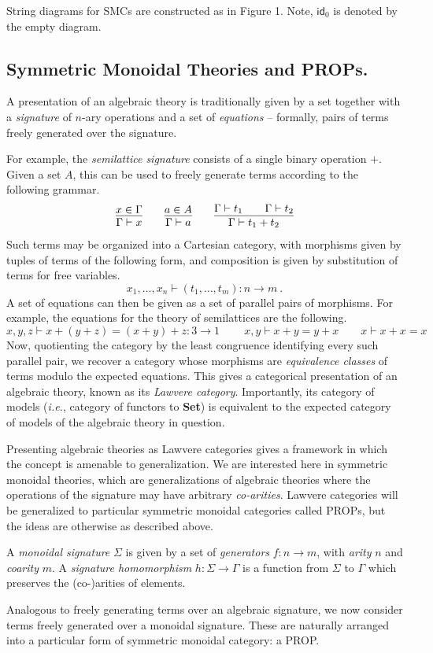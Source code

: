 String diagrams for {SMCs} are constructed as in Figure 1. Note, $\textsf{id}_0$ is denoted by the empty diagram. 


\subsection{Symmetric Monoidal Theories and PROPs. }

A presentation of an algebraic theory is traditionally given by a set together with a \textit{signature} of $n$-ary operations and a set of \textit{equations} -- formally,  pairs of terms freely generated over the signature.  

For example, the \textit{semilattice signature} consists of a single binary operation $+$.  Given a set $A$, this can be used to freely generate terms according to the following grammar.
\begin{align*}
	\infer{\Gamma \vdash x}{x \in \Gamma} \qquad \infer{\Gamma \vdash a}{a \in A} \qquad \infer{\Gamma \vdash t_1 + t_2}{\Gamma \vdash t_1 && \Gamma \vdash t_2} 
\end{align*}
Such terms may be organized into a Cartesian category, with morphisms given by tuples of terms of the following form,  and composition is given by substitution of terms for free variables.  
\[
	x_1, \ldots, x_n \vdash (t_1, \ldots, t_m) : n \to m\ .
\]
A set of equations can then be given as a set of parallel pairs of morphisms.  
For example, the equations for the theory of semilattices are the following.
\[
	x,y,z \vdash x+(y+z) = (x+y)+z : 3 \to 1\ \qquad  
    x,y \vdash x+y = y+x \qquad 
    x \vdash x+x = x
\]
Now, quotienting the category by the least congruence identifying every such parallel pair, we recover a category whose morphisms are \textit{equivalence classes} of terms modulo the expected equations. 
This gives a categorical presentation of an algebraic theory, known as its \textit{Lawvere category}. 
Importantly,  its category of models (\textit{i.e.}, category of functors to \textbf{Set}) is equivalent to the expected category of models of the algebraic theory in question.  

Presenting algebraic theories as Lawvere categories gives a framework in which the concept is amenable to generalization.  We are interested here in symmetric monoidal theories, which are generalizations of algebraic theories where the operations of the signature may have arbitrary \textit{co-arities}.  Lawvere categories will be generalized to particular symmetric monoidal categories called PROPs, but the ideas are otherwise as described above. 
\begin{definition}
A \textit{monoidal signature} $\Sigma$ is given by a set of \textit{generators} $f: n \to m$,  with \textit{arity} $n$ and \textit{coarity} $m$.  A \textit{signature homomorphism} $h: \Sigma \to \Gamma$ is a function from $\Sigma$ to $\Gamma$ which preserves the (co-)arities of elements. 
\end{definition}
Analogous to freely generating terms over an algebraic signature,  we now consider terms freely generated over a monoidal signature.  These are naturally arranged into a particular form of symmetric monoidal category: a PROP. 

